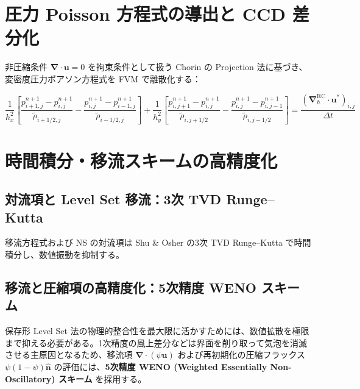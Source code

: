 \documentclass[12pt, a4paper, titlepage, xelatex, ja=standard]{bxjsarticle}
\newcommand{\bu}{\bm{u}}
\newcommand{\bnabla}{\bm{\nabla}}
\begin{document}
\section{圧力 Poisson 方程式の導出と CCD 差分化}
\label{sec:pressure}

非圧縮条件 $\bnabla\cdot\bu = 0$ を拘束条件として扱う Chorin \cite{Chorin1968} の Projection 法に基づき、変密度圧力ポアソン方程式を FVM で離散化する：

\begin{tcolorbox}[mybox, title={FVM 変密度 PPE（Rhie-Chow 整合，2次元）}]
\begin{equation}
  \frac{1}{h_x^2}\!\left[
    \frac{p^{n+1}_{i+1,j}-p^{n+1}_{i,j}}{\tilde\rho_{i+1/2,j}}
  - \frac{p^{n+1}_{i,j}-p^{n+1}_{i-1,j}}{\tilde\rho_{i-1/2,j}}
  \right]
  + \frac{1}{h_y^2}\!\left[
    \frac{p^{n+1}_{i,j+1}-p^{n+1}_{i,j}}{\tilde\rho_{i,j+1/2}}
  - \frac{p^{n+1}_{i,j}-p^{n+1}_{i,j-1}}{\tilde\rho_{i,j-1/2}}
  \right]
  = \frac{(\bnabla_h^{\mathrm{RC}}\!\cdot\bu^*)_{i,j}}{\Delta t}
  \label{eq:PPE_FVM}
\end{equation}
\end{tcolorbox}


\section{時間積分・移流スキームの高精度化}
\label{sec:time}

\subsection{対流項と Level Set 移流：3次 TVD Runge--Kutta}

移流方程式および NS の対流項は Shu \& Osher \cite{ShuOsher1988} の3次 TVD Runge--Kutta で時間積分し、数値振動を抑制する。

\subsection{移流と圧縮項の高精度化：5次精度 WENO スキーム}
\label{sec:upstream}

保存形 Level Set 法の物理的整合性を最大限に活かすためには、数値拡散を極限まで抑える必要がある。1次精度の風上差分などは界面を削り取って気泡を消滅させる主原因となるため、移流項 $\bnabla\cdot(\psi\bu)$ および再初期化の圧縮フラックス $\psi(1-\psi)\hat{\bm{n}}$ の評価には、\textbf{5次精度 WENO (Weighted Essentially Non-Oscillatory) スキーム} \cite{JiangPeng2000} を採用する。
\end{document}
